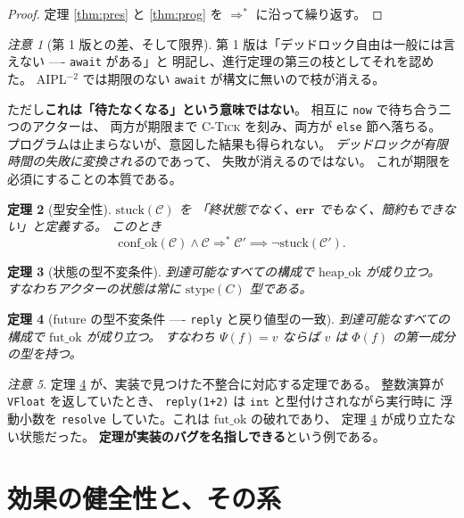 \documentclass[11pt,a4paper]{ltjsarticle}
\newtheorem{theorem}{定理}
\theoremstyle{definition}
\theoremstyle{remark}
\newtheorem{remark}[theorem]{注意}
\newcommand{\tint}{\ensuremath{\mathtt{int}}}
\newcommand{\Ph}{\Phi}
\newcommand{\Ps}{\Psi}
\newcommand{\stype}{\mathrm{stype}}
\newcommand{\heapok}{\mathrm{heap\_ok}}
\newcommand{\confok}{\mathrm{conf\_ok}}
\newcommand{\futok}{\mathrm{fut\_ok}}
\newcommand{\stuck}{\mathrm{stuck}}
\newcommand{\cstep}{\Longrightarrow}
\begin{document}
\begin{proof}
定理 \ref{thm:pres} と \ref{thm:prog} を $\cstep^{*}$ に沿って繰り返す。
\end{proof}

\begin{remark}[第 1 版との差、そして限界]
第 1 版は「デッドロック自由は一般には言えない ---- \texttt{await} がある」と
明記し、進行定理の第三の枝としてそれを認めた。
AIPL$^{-2}$ では期限のない \texttt{await} が構文に無いので枝が消える。

ただし\textbf{これは「待たなくなる」という意味ではない}。
相互に \texttt{now} で待ち合う二つのアクターは、
両方が期限まで \textsc{C-Tick} を刻み、両方が \texttt{else} 節へ落ちる。
プログラムは止まらないが、意図した結果も得られない。
\emph{デッドロックが有限時間の失敗に変換される}のであって、
失敗が消えるのではない。
これが期限を必須にすることの本質である。
\end{remark}

\begin{theorem}[型安全性]
\label{thm:safety}
$\stuck(\mathcal{C})$ を
「終状態でなく、$\mathbf{err}$ でもなく、簡約もできない」と定義する。
このとき
\[
\confok(\mathcal{C}) \land \mathcal{C} \cstep^{*} \mathcal{C}'
\implies \lnot\stuck(\mathcal{C}').
\]
\end{theorem}

\begin{theorem}[状態の型不変条件]
\label{thm:stinv}
到達可能なすべての構成で $\heapok$ が成り立つ。
すなわちアクターの状態は常に $\stype(C)$ 型である。
\end{theorem}

\begin{theorem}[future の型不変条件 ---- \texttt{reply} と戻り値型の一致]
\label{thm:futinv}
到達可能なすべての構成で $\futok$ が成り立つ。
すなわち $\Ps(f) = v$ ならば $v$ は $\Ph(f)$ の第一成分の型を持つ。
\end{theorem}

\begin{remark}
定理 \ref{thm:futinv} が、実装で見つけた不整合に対応する定理である。
整数演算が \texttt{VFloat} を返していたとき、
\texttt{reply(1+2)} は $\tint$ と型付けされながら実行時に
浮動小数を \texttt{resolve} していた。これは $\futok$ の破れであり、
定理 \ref{thm:futinv} が成り立たない状態だった。
\textbf{定理が実装のバグを名指しできる}という例である。
\end{remark}

\section{効果の健全性と、その系}
\end{document}
